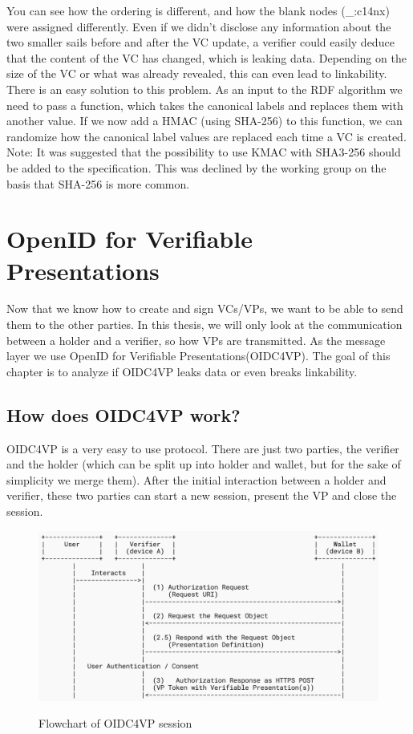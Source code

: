 \documentclass[
	a4paper               %
	,BCOR=0mm            %
	,bibliography=totoc   %
	,listof=totoc         %
	,monolingual
	,twoside=false
]{bfhthesis}              %
\begin{document}
You can see how the ordering is different, and how the blank nodes (\_:c14nx) were assigned differently.
Even if we didn't disclose any information about the two smaller sails before and after the VC update, a verifier could easily deduce that the content of the VC has changed, which is leaking data. Depending on the size of the VC or what was already revealed, this can even lead to linkability.\\

There is an easy solution to this problem.
As an input to the RDF algorithm we need to pass a function, which takes the canonical labels and replaces them with another value.
If we now add a HMAC (using SHA-256) to this function, we can randomize how the canonical label values are replaced each time a VC is created.\\

Note: It was suggested that the possibility to use KMAC with SHA3-256 should be added to the specification. This was declined by the working group on the basis that SHA-256 is more common.


\chapter{OpenID for Verifiable Presentations}
Now that we know how to create and sign VCs/VPs, we want to be able to send them to the other parties.
In this thesis, we will only look at the communication between a holder and a verifier, so how VPs are transmitted.
As the message layer we use OpenID for Verifiable Presentations(OIDC4VP)\cite{oidc4vp}.
The goal of this chapter is to analyze if OIDC4VP leaks data or even breaks linkability.

\section{How does OIDC4VP work?}
OIDC4VP is a very easy to use protocol.
There are just two parties, the verifier and the holder (which can be split up into holder and wallet, but for the sake of simplicity we merge them).
After the initial interaction between a holder and verifier, these two parties can start a new session, present the VP and close the session.

\begin{figure}[h]
	\centering
	\includegraphics[width=12cm]{./img/oidc4vpflow.png}
	\label{fig:flowvp}
	\caption{Flowchart of OIDC4VP session}
\end{figure}
\end{document}
